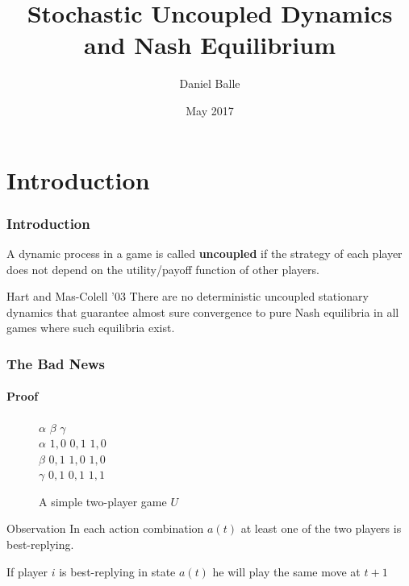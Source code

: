 \documentclass{beamer}
\title{Stochastic Uncoupled Dynamics\\and Nash Equilibrium}
\author{Daniel Balle}
\institute{ETH Z\"{u}rich}
\date{May 2017}
\begin{document}
\beamertemplatenavigationsymbolsempty
 
\frame{\titlepage}
 
\section{Introduction}

\begin{frame}
    \frametitle{Introduction}
	\begin{definition}[Uncoupledness]
        A dynamic process in a game is called \textbf{uncoupled}
        if the strategy of each player does not depend on the
        utility/payoff function of other players.
    \end{definition}
    \pause
    \begin{alertblock}{Hart and Mas-Colell '03}
        There are no deterministic uncoupled stationary dynamics that guarantee almost sure
        convergence to pure Nash equilibria in all games where such equilibria exist.
    \end{alertblock}
\end{frame}
    
\begin{frame}
    \frametitle{The Bad News}
    \framesubtitle{Proof}
    \vspace{-20pt}
    \begin{figure}[h]
    \centering
    \begin{game}{3}{3}
            \>  $\alpha$ \>  $\beta$  \> $\gamma$ \\
         $\alpha$    \>  $1, 0$ \> $0, 1$ \> $1,0$\\
         $\beta$      \>  $0, 1$ \> $1, 0$ \> $1, 0$\\
         $\gamma$ \>  $0, 1$ \> $0, 1$ \> $1, 1$\\
    \end{game}
    \caption{A simple two-player game $U$}
    \end{figure}
    \vspace{-10pt}
    \begin{exampleblock}{Observation}
        In each action combination $a(t)$ at least one of the two players is best-replying.
    \end{exampleblock}
    \pause
    \begin{lemma}
        If player $i$ is best-replying in state $a(t)$ he will play the same move at $t+1$
    \end{lemma}
\end{frame}
\end{document}
